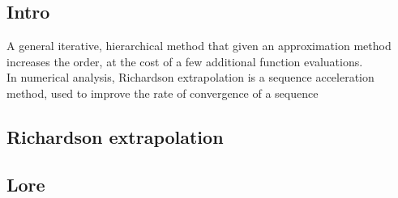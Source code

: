 \documentclass[11pt,a4paper]{article}
\begin{document}
\subsection*{Intro}
A general iterative, hierarchical method that given an approximation method increases the order, at the cost of a few additional function evaluations.\\
In numerical analysis, Richardson extrapolation is a sequence acceleration method, used to improve the rate of convergence of a sequence

\subsection*{Richardson extrapolation}


\subsection*{Lore}
\end{document}
